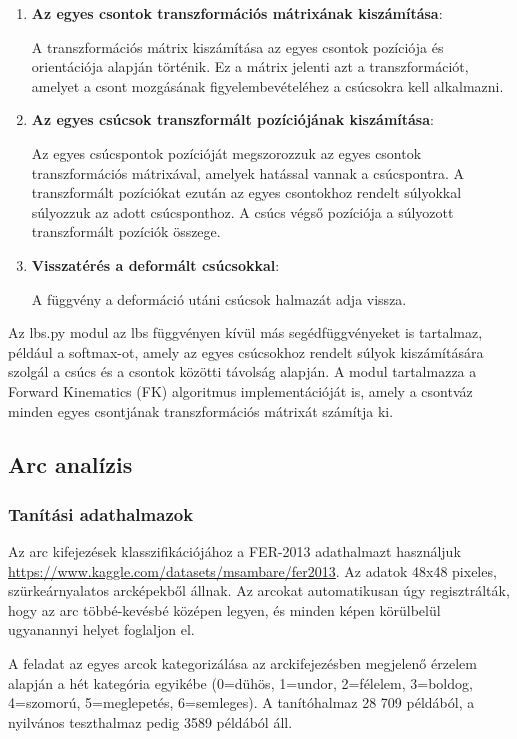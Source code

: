 \documentclass[12pt,a4]{article}
\begin{document}
\begin{enumerate}
    \item \textbf{Az egyes csontok transzformációs mátrixának kiszámítása}: 
    
    A transzformációs mátrix kiszámítása az egyes csontok pozíciója és orientációja alapján történik. 
	Ez a mátrix jelenti azt a transzformációt, amelyet a csont mozgásának figyelembevételéhez a csúcsokra kell alkalmazni.

     \item \textbf{Az egyes csúcsok transzformált pozíciójának kiszámítása}:
     
     Az egyes csúcspontok pozícióját megszorozzuk az egyes csontok transzformációs mátrixával, amelyek hatással vannak a csúcspontra.
	A transzformált pozíciókat ezután az egyes csontokhoz rendelt súlyokkal súlyozzuk az adott csúcsponthoz. A csúcs végső pozíciója a súlyozott transzformált pozíciók összege.
	
     \item \textbf{Visszatérés a deformált csúcsokkal}: 
     
     A függvény a deformáció utáni csúcsok halmazát adja vissza.
	
\end{enumerate}

    Az lbs.py modul az lbs függvényen kívül más segédfüggvényeket is tartalmaz, például a softmax-ot, amely az egyes csúcsokhoz rendelt súlyok kiszámítására szolgál a csúcs és a csontok közötti távolság alapján. 
A modul tartalmazza a Forward Kinematics (FK) algoritmus implementációját is, amely a csontváz minden egyes csontjának transzformációs mátrixát számítja ki.


    \newpage
	\subsection{Arc analízis}

    \subsubsection{Tanítási adathalmazok}
    Az arc kifejezések klasszifikációjához a FER-2013 adathalmazt használjuk \url{https://www.kaggle.com/datasets/msambare/fer2013}. Az adatok 48x48 pixeles, szürkeárnyalatos arcképekből állnak. Az arcokat automatikusan úgy regisztrálták, hogy az arc többé-kevésbé középen legyen, és minden képen körülbelül ugyanannyi helyet foglaljon el.

    A feladat az egyes arcok kategorizálása az arckifejezésben megjelenő érzelem alapján a hét kategória egyikébe (0=dühös, 1=undor, 2=félelem, 3=boldog, 4=szomorú, 5=meglepetés, 6=semleges). A tanítóhalmaz 28 709 példából, a nyilvános teszthalmaz pedig 3589 példából áll.
\end{document}
